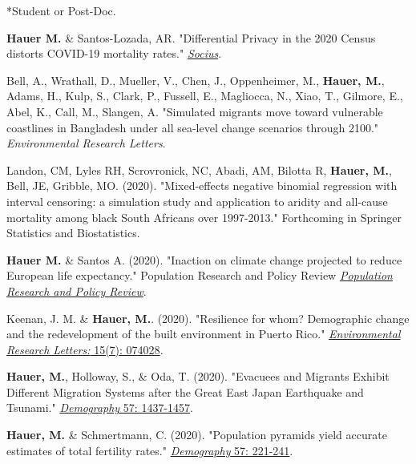  *Student or Post-Doc.

 \begin{etaremune}

    \item \textbf{Hauer M.} \& Santos-Lozada, AR. "Differential Privacy in the 2020 Census distorts COVID-19 mortality rates." \href{https://osf.io/mvh5b/}{\textit{Socius}}. \\

    \item Bell, A., Wrathall, D., Mueller, V., Chen, J., Oppenheimer, M., \textbf{Hauer, M.}, Adams, H., Kulp, S., Clark, P., Fussell, E., Magliocca, N., Xiao, T., Gilmore, E., Abel, K., Call, M., Slangen, A. "Simulated migrants move toward vulnerable coastlines in Bangladesh under all sea-level change scenarios through 2100." \textit{Environmental Research Letters}.\\


    \item Landon, CM, Lyles RH, Scrovronick, NC, Abadi, AM, Bilotta R, \textbf{Hauer, M.}, Bell, JE, Gribble, MO. (2020). "Mixed-effects negative binomial regression with interval censoring: a simulation study and application to aridity and all-cause mortality among black South Africans over 1997-2013." Forthcoming in Springer Statistics and Biostatistics. \\


    \item\textbf{Hauer M.} \& Santos A. (2020). "Inaction on climate change projected to reduce European life expectancy." Population Research and Policy Review \href{https://doi.org/10.1007/s11113-020-09584-w}{\textit{Population Research and Policy Review}}.\\

     \item Keenan, J. M. \& \textbf{Hauer, M.}. (2020). "Resilience for whom? Demographic change and the
redevelopment of the built environment in Puerto Rico." \href{https://doi.org/10.1088/1748-9326/ab92c2}{\textit{Environmental Research Letters:} 15(7): 074028}.

     \item \textbf{Hauer, M.}, Holloway, S., \& Oda, T. (2020). "Evacuees and Migrants Exhibit Different Migration Systems after the Great East Japan Earthquake and Tsunami." \href{https://link.springer.com/article/10.1007/s13524-020-00883-7}{\textit{Demography} 57: 1437-1457}.\\

     \item \textbf{Hauer, M.} \& Schmertmann, C. (2020). "Population pyramids yield accurate estimates of total fertility rates." \href{https://link.springer.com/article/10.1007/s13524-019-00842-x}{\textit{Demography} 57: 221-241}.\\


\end{etaremune}
